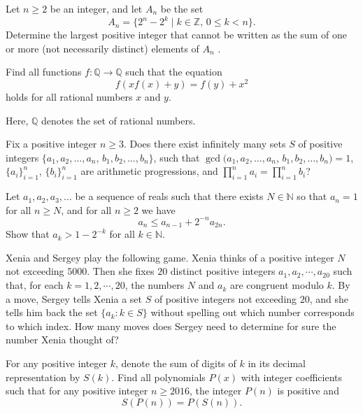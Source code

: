 \documentclass[11pt]{scrartcl}
\begin{document}
\begin{problem}[888579900722065]
Let $n \ge 2$ be an integer, and let $A_n$ be the set\[A_n = \{2^n  - 2^k\mid k \in \mathbb{Z},\, 0 \le k < n\}.\]Determine the largest positive integer that cannot be written as the sum of one or more (not necessarily distinct) elements of $A_n$ .
\end{problem}
\begin{problem}[891406366009347]
Find all functions $f:\mathbb{Q}\to\mathbb{Q}$ such that the equation
\[f(xf(x)+y) = f(y) + x^2\]holds for all rational numbers $x$ and $y$.

Here, $\mathbb{Q}$ denotes the set of rational numbers.
\end{problem}
\begin{problem}[892078665065056]
Fix a positive integer $n\geq 3$. Does there exist infinitely many sets $S$ of positive integers $\lbrace a_1,a_2,\ldots, a_n$, $b_1,b_2,\ldots,b_n\rbrace$, such that $\gcd (a_1,a_2,\ldots, a_n$, $b_1,b_2,\ldots,b_n)=1$, $\lbrace a_i\rbrace _{i=1}^n$, $\lbrace b_i\rbrace _{i=1}^n$ are arithmetic progressions, and $\prod_{i=1}^n a_i = \prod_{i=1}^n b_i$?
\end{problem}
\begin{problem}[893022419722224]
Let $a_1, a_2, a_3, \ldots$ be a sequence of reals such that there exists $N\in\mathbb{N}$ so that $a_n=1$ for all $n\geq N$, and for all $n\geq 2$ we have
\[a_{n}\leq a_{n-1}+2^{-n}a_{2n}.\]Show that $a_k>1-2^{-k}$ for all $k\in\mathbb{N}$.
\end{problem}
\begin{problem}[894895504790373]
Xenia and Sergey play the following game. Xenia thinks of a positive integer $N$ not exceeding $5000$. Then she fixes $20$ distinct positive integers $a_1, a_2, \cdots, a_{20}$ such that, for each $k = 1,2,\cdots,20$, the numbers $N$ and $a_k$ are congruent modulo $k$. By a move, Sergey tells Xenia a set $S$ of positive integers not exceeding $20$, and she tells him back the set $\{a_k : k \in S\}$ without spelling out which number corresponds to which index. How many moves does Sergey need to determine for sure the number Xenia thought of?
\end{problem}
\begin{problem}[895654249061658]
	For any positive integer $k$, denote the sum of digits of $k$ in its decimal representation by $S(k)$. Find all polynomials $P(x)$ with integer coefficients such that for any positive integer $n \geq 2016$, the integer $P(n)$ is positive and$$S(P(n)) = P(S(n)).$$
\end{problem}
\end{document}
